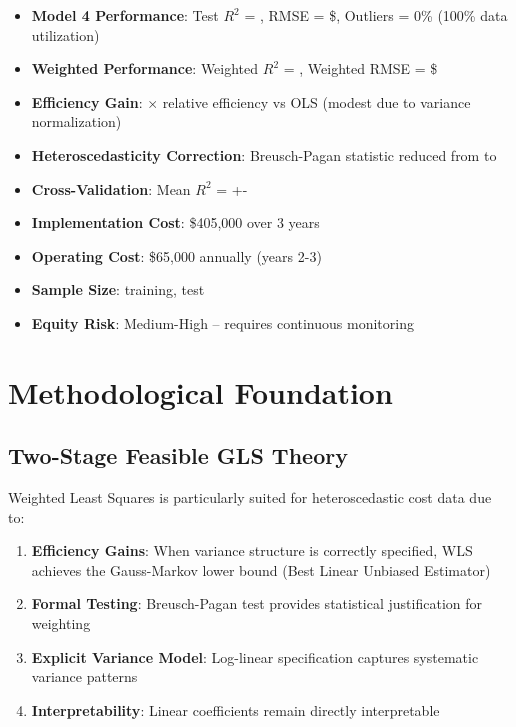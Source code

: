 \begin{itemize}
    \item \textbf{Model 4 Performance}: Test $R^2$ = \ModelFourRSquaredTest{}, RMSE = \$\ModelFourRMSETest{}, Outliers = 0\% (100\% data utilization)
    \item \textbf{Weighted Performance}: Weighted $R^2$ = \ModelFourWeightedRSquared{}, Weighted RMSE = \$\ModelFourWeightedRMSE{}
    \item \textbf{Efficiency Gain}: \ModelFourEfficiencyRatio{}$\times$ relative efficiency vs OLS (modest due to variance normalization)
    \item \textbf{Heteroscedasticity Correction}: Breusch-Pagan statistic reduced from \ModelFourBreuschPagan{} to \ModelFourBreuschPaganAfter{}
    \item \textbf{Cross-Validation}: Mean $R^2$ = \ModelFourCVMean{} +- \ModelFourCVStd{}
    \item \textbf{Implementation Cost}: \$405,000 over 3 years
    \item \textbf{Operating Cost}: \$65,000 annually (years 2-3)
    \item \textbf{Sample Size}: \ModelFourTrainingSamples{} training, \ModelFourTestSamples{} test
    \item \textbf{Equity Risk}: Medium-High -- requires continuous monitoring
\end{itemize}

\section{Methodological Foundation}

\subsection{Two-Stage Feasible GLS Theory}

Weighted Least Squares is particularly suited for heteroscedastic cost data due to:

\begin{enumerate}
    \item \textbf{Efficiency Gains}: When variance structure is correctly specified, WLS achieves the Gauss-Markov lower bound (Best Linear Unbiased Estimator)
    \item \textbf{Formal Testing}: Breusch-Pagan test provides statistical justification for weighting
    \item \textbf{Explicit Variance Model}: Log-linear specification captures systematic variance patterns
    \item \textbf{Interpretability}: Linear coefficients remain directly interpretable
\end{enumerate}

